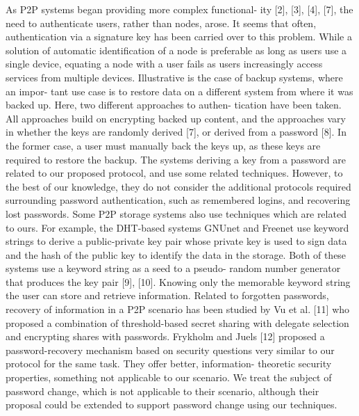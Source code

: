 As P2P systems began providing more complex functional-
ity [2], [3], [4], [7], the need to authenticate users, rather than
nodes, arose. It seems that often, authentication via a signature
key has been carried over to this problem. While a solution
of automatic identification of a node is preferable as long as
users use a single device, equating a node with a user fails as
users increasingly access services from multiple devices.
Illustrative is the case of backup systems, where an impor-
tant use case is to restore data on a different system from where
it was backed up. Here, two different approaches to authen-
tication have been taken. All approaches build on encrypting
backed up content, and the approaches vary in whether the
keys are randomly derived [7], or derived from a password [8].
In the former case, a user must manually back the keys up,
as these keys are required to restore the backup. The systems
deriving a key from a password are related to our proposed
protocol, and use some related techniques. However, to the
best of our knowledge, they do not consider the additional
protocols required surrounding password authentication, such
as remembered logins, and recovering lost passwords.
Some P2P storage systems also use techniques which are
related to ours. For example, the DHT-based systems GNUnet
and Freenet use keyword strings to derive a public-private key
pair whose private key is used to sign data and the hash of
the public key to identify the data in the storage. Both of
these systems use a keyword string as a seed to a pseudo-
random number generator that produces the key pair [9], [10].
Knowing only the memorable keyword string the user can
store and retrieve information.
Related to forgotten passwords, recovery of information in a
P2P scenario has been studied by Vu et al. [11] who proposed
a combination of threshold-based secret sharing with delegate
selection and encrypting shares with passwords.
Frykholm and Juels [12] proposed a password-recovery
mechanism based on security questions very similar to our
protocol for the same task. They offer better, information-
theoretic security properties, something not applicable to our
scenario. We treat the subject of password change, which is not applicable to
their scenario, although their proposal could be extended to support password
change using our techniques.



